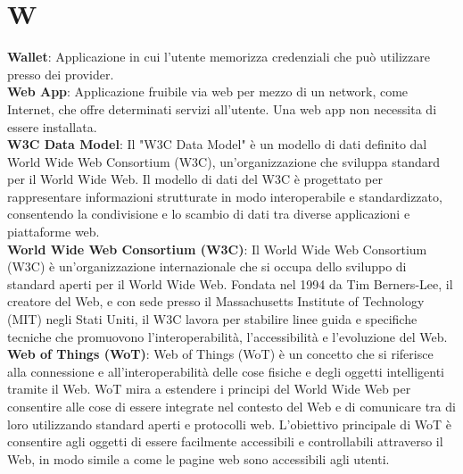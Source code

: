 \section{W}
\textbf{Wallet}: Applicazione in cui l'utente memorizza credenziali che può utilizzare presso dei provider.\\ %
\textbf{Web App}: Applicazione fruibile via web per mezzo di un network, come Internet, che offre determinati servizi all'utente. Una web app non necessita di essere installata.\\
\textbf{W3C Data Model}: Il "W3C Data Model" è un modello di dati definito dal World Wide Web Consortium (W3C), un'organizzazione che sviluppa standard per il World Wide Web. Il modello di dati del W3C è progettato per rappresentare informazioni strutturate in modo interoperabile e standardizzato, consentendo la condivisione e lo scambio di dati tra diverse applicazioni e piattaforme web.\\
\textbf{World Wide Web Consortium (W3C)}: Il World Wide Web Consortium (W3C) è un'organizzazione internazionale che si occupa dello sviluppo di standard aperti per il World Wide Web. Fondata nel 1994 da Tim Berners-Lee, il creatore del Web, e con sede presso il Massachusetts Institute of Technology (MIT) negli Stati Uniti, il W3C lavora per stabilire linee guida e specifiche tecniche che promuovono l'interoperabilità, l'accessibilità e l'evoluzione del Web.\\
\textbf{Web of Things (WoT)}: Web of Things (WoT) è un concetto che si riferisce alla connessione e all'interoperabilità delle cose fisiche e degli oggetti intelligenti tramite il Web. WoT mira a estendere i principi del World Wide Web per consentire alle cose di essere integrate nel contesto del Web e di comunicare tra di loro utilizzando standard aperti e protocolli web. L'obiettivo principale di WoT è consentire agli oggetti di essere facilmente accessibili e controllabili attraverso il Web, in modo simile a come le pagine web sono accessibili agli utenti.
